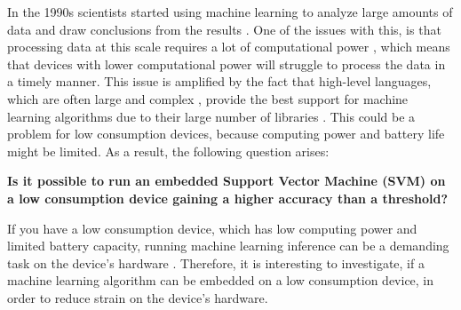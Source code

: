 In the 1990s scientists started using machine learning to analyze large amounts of data and draw conclusions from the results \cite{marr2016short}.
One of the issues with this, is that processing data at this scale requires a lot of computational power \cite{garcia2019estimation}, which means that devices with lower computational power will struggle to process the data in a timely manner.
This issue is amplified by the fact that high-level languages, which are often large and complex , provide the best support for machine learning algorithms due to their large number of libraries \cite{top5mllangs}. 
This could be a problem for low consumption devices, because computing power and battery life might be limited. As a result, the following question arises: 
\begin{center}
\textbf{Is it possible to run an embedded Support Vector Machine (SVM)  on a low consumption device gaining a higher accuracy than a threshold?}
\end{center}
If you have a low consumption device, which has low computing power and limited battery capacity, running machine learning inference can be a demanding task on the device's hardware \cite{batterylifewearablesensors}. Therefore, it is interesting to investigate, if a machine learning algorithm can be embedded on a low consumption device, in order to reduce strain on the device's hardware.\\


